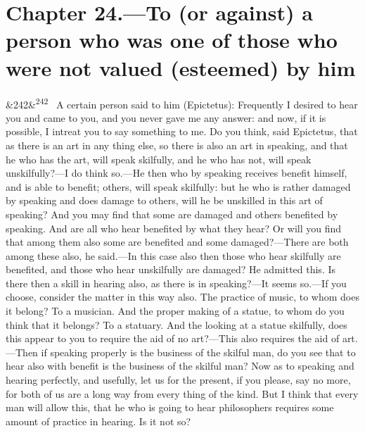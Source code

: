 \documentclass[12pt]{article}
\newcommand{\para}[1][]{\par\noindent\ifx&#1&\else\textsuperscript{\footnotesize #1}~\fi}
\begin{document}
\section*{Chapter 24.---To (or against) a person who was one of those who were not valued (esteemed) by him}

\para[242] A certain person said to him (Epictetus): Frequently I desired to hear you and came to you, and you never gave me any answer: and now, if it is possible, I intreat you to say something to me. Do you think, said Epictetus, that as there is an art in any thing else, so there is also an art in speaking, and that he who has the art, will speak skilfully, and he who has not, will speak unskilfully?—I do think so.—He then who by speaking receives benefit himself, and is able to benefit; others, will speak skilfully: but he who is rather damaged by speaking and does damage to others, will he be unskilled in this art of speaking? And you may find that some are damaged and others benefited by speaking. And are all who hear benefited by what they hear? Or will you find that among them also some are benefited and some damaged?—There are both among these also, he said.—In this case also then those who hear skilfully are benefited, and those who hear unskilfully are damaged? He admitted this. Is there then a skill in hearing also, as there is in speaking?—It seems so.—If you choose, consider the matter in this way also. The practice of music, to whom does it belong? To a musician. And the proper making of a statue, to whom do you think that it belongs? To a statuary. And the looking at a statue skilfully, does this appear to you to require the aid of no art?—This also requires the aid of art.—Then if speaking properly is the business of the skilful man, do you see that to hear also with benefit is the business of the skilful man? Now as to speaking and hearing perfectly, and usefully, let us for the present, if you please, say no more, for both of us are a long way from every thing of the kind. But I think that every man will allow this, that he who is going to hear philosophers requires some amount of practice in hearing. Is it not so?
\end{document}

